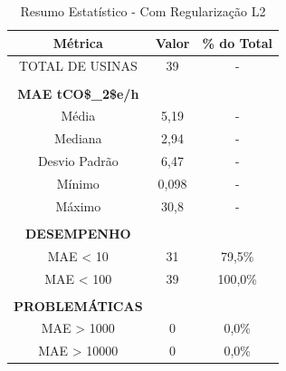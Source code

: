 \begin{table}[H]
    \centering
    \renewcommand{\arraystretch}{2}
    \begin{tabular}{|ccc|}
    \hline
    \multicolumn{1}{|c|}{\textbf{Métrica}} & \multicolumn{1}{c|}{\textbf{Valor}} & \textbf{\% do Total} \\ \hline
    \multicolumn{1}{|c|}{TOTAL DE USINAS} & \multicolumn{1}{c|}{39} & - \\ \hline
    \multicolumn{3}{|c|}{} \\ \hline
    \multicolumn{1}{|c|}{\textbf{MAE \ac{tCO$_2$e}/h}} & \multicolumn{1}{c|}{} & \\ \hline
    \multicolumn{1}{|c|}{Média} & \multicolumn{1}{c|}{5,19} & - \\ \hline
    \multicolumn{1}{|c|}{Mediana} & \multicolumn{1}{c|}{2,94} & - \\ \hline
    \multicolumn{1}{|c|}{Desvio Padrão} & \multicolumn{1}{c|}{6,47} & - \\ \hline
    \multicolumn{1}{|c|}{Mínimo} & \multicolumn{1}{c|}{0,098} & - \\ \hline
    \multicolumn{1}{|c|}{Máximo} & \multicolumn{1}{c|}{30,8} & - \\ \hline
    \multicolumn{3}{|c|}{} \\ \hline
    \multicolumn{1}{|c|}{\textbf{DESEMPENHO}} & \multicolumn{1}{c|}{} & \\ \hline
    \multicolumn{1}{|c|}{MAE < 10} & \multicolumn{1}{c|}{31} & 79,5\% \\ \hline
    \multicolumn{1}{|c|}{MAE < 100} & \multicolumn{1}{c|}{39} & 100,0\% \\ \hline
    \multicolumn{3}{|c|}{} \\ \hline
    \multicolumn{1}{|c|}{\textbf{PROBLEMÁTICAS}} & \multicolumn{1}{c|}{} & \\ \hline
    \multicolumn{1}{|c|}{MAE > 1000} & \multicolumn{1}{c|}{0} & 0,0\% \\ \hline
    \multicolumn{1}{|c|}{MAE > 10000} & \multicolumn{1}{c|}{0} & 0,0\% \\ \hline
    \end{tabular}
    \caption{Resumo Estatístico - Com Regularização L2}
    \label{tab:resumo_l2}
\end{table}